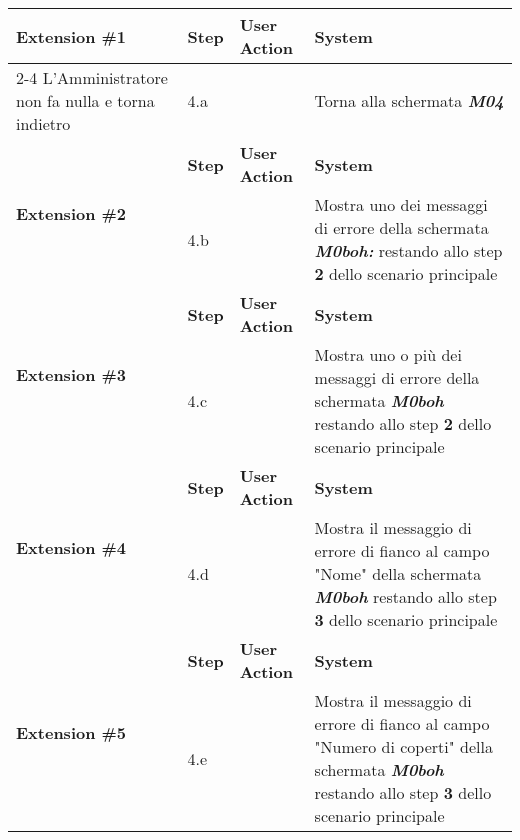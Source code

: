         \begin{table}[H]    
    
        \def\arraystretch{1.5}
        
        
        \begin{tabularx}{\linewidth}{|X|X|X|X|}
        


         \hline \multirow{2}{*}{\textbf{Extension \#1}} & \textbf{Step} &
         \textbf{User Action} & \textbf{System} \\
         \cline{2-4} {L'Amministratore non fa nulla e torna indietro} &{4.a} & & {Torna alla schermata \textbf{\textit{M04}}} \\


         
          \hline\multirow{2}{*}{\textbf{Extension \#2}} & \textbf{Step} & \textbf{User Action} & \textbf{System} \\
         \cline{2-4} {L'amministratore ha aggiunto un Ristorante già presente nella propria lista di Ristoranti} & {4.b} & & {Mostra uno dei messaggi di errore della schermata \textbf{\textit{{M0boh:}}} restando allo step \textbf{2} dello scenario principale} \\
        

        \hline\multirow{2}{*}{\textbf{Extension \#3}} & \textbf{Step} & \textbf{User Action} & \textbf{System} \\
         \cline{2-4} {L'amministratore ha lasciato uno o più campi vuoti} & {4.c} & & {Mostra uno o più dei messaggi di errore della schermata \textbf{\textit{{M0boh}}} restando allo step \textbf{2} dello scenario principale} \\

         
        \hline\multirow{2}{*}{\textbf{Extension \#4}} & \textbf{Step} & \textbf{User Action} & \textbf{System} \\
         \cline{2-4} {L'amministratore ha aggiunto un nome troppo corto} & {4.d} & & {Mostra il messaggio di errore di fianco al campo "Nome" della schermata \textbf{\textit{{M0boh}}} restando allo step \textbf{3} dello scenario principale} \\
         

         \hline\multirow{2}{*}{\textbf{Extension \#5}} & \textbf{Step} & \textbf{User Action} & \textbf{System} \\
         \cline{2-4} {L'amministratore ha aggiunto un numero di coperti non valido} & {4.e} & & {Mostra il messaggio di errore di fianco al campo "Numero di coperti" della schermata \textbf{\textit{{M0boh}}} restando allo step \textbf{3} dello scenario principale} \\
         


\end{tabularx}
\end{table}
